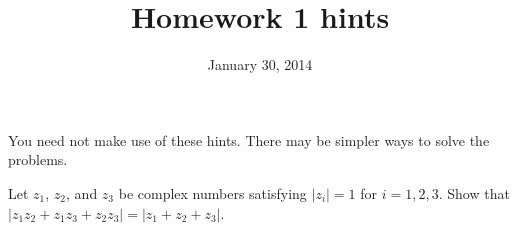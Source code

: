 
         \newcommand\alg[1]{\ensuremath{\mathbf{#1}}}
         \newcommand{\<}{\ensuremath{\langle}}
         \renewcommand{\>}{\ensuremath{\rangle}}
         \newcommand\fld[1]{\ensuremath{\mathbb{#1}}}

         \author{}
         \title{Homework 1 hints}
         \date{January 30, 2014}



\maketitle

You need not make use of these hints. There may be simpler ways to solve
the problems.

\begin{prob}[Golan 16]
Let $z_1$, $z_2$, and $z_3$ be complex numbers satisfying 
$|z_i| = 1$ for $i = 1, 2, 3$. Show that 
$|z_1 z_2 + z_1 z_3 + z_2 z_3 | = |z_1 + z_2 + z_3|$.
\end{prob}

